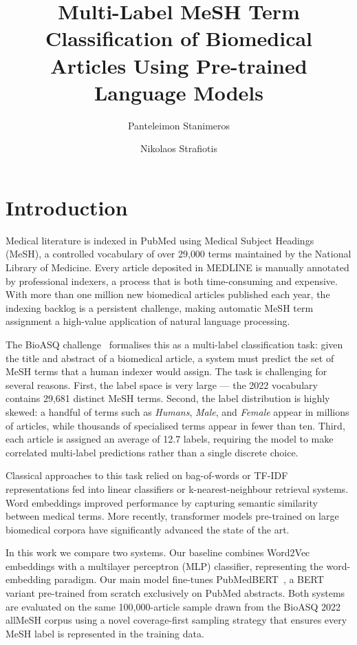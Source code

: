 \documentclass[sigconf]{acmart}
\title{Multi-Label MeSH Term Classification of Biomedical Articles Using Pre-trained Language Models}
\author{Panteleimon Stanimeros}
\affiliation{%
  \institution{MSc in AI and Data Analytics, University of Macedonia}
  \city{Thessaloniki}
  \country{Greece}
}
\author{Nikolaos Strafiotis}
\affiliation{%
  \institution{MSc in AI and Data Analytics, University of Macedonia}
  \city{Thessaloniki}
  \country{Greece}
}
\begin{document}
\maketitle

\section{Introduction}

Medical literature is indexed in PubMed using Medical Subject Headings (MeSH), a controlled
vocabulary of over 29{,}000 terms maintained by the National Library of Medicine. Every article
deposited in MEDLINE is manually annotated by professional indexers, a process that is both
time-consuming and expensive. With more than one million new biomedical articles published each
year, the indexing backlog is a persistent challenge, making automatic MeSH term assignment a
high-value application of natural language processing.

The BioASQ challenge~\cite{bioasq2015} formalises this as a multi-label classification task:
given the title and abstract of a biomedical article, a system must predict the set of MeSH terms
that a human indexer would assign. The task is challenging for several reasons. First, the label
space is very large — the 2022 vocabulary contains 29{,}681 distinct MeSH terms. Second, the label
distribution is highly skewed: a handful of terms such as \textit{Humans}, \textit{Male}, and
\textit{Female} appear in millions of articles, while thousands of specialised terms appear in
fewer than ten. Third, each article is assigned an average of 12.7 labels, requiring the model
to make correlated multi-label predictions rather than a single discrete choice.

Classical approaches to this task relied on bag-of-words or TF-IDF representations fed into
linear classifiers or k-nearest-neighbour retrieval systems. Word embeddings improved performance
by capturing semantic similarity between medical terms. More recently, transformer models
pre-trained on large biomedical corpora have significantly advanced the state of the art.

In this work we compare two systems. Our baseline combines Word2Vec embeddings with a multilayer
perceptron (MLP) classifier, representing the word-embedding paradigm. Our main model fine-tunes
PubMedBERT~\cite{pubmedbert}, a BERT variant pre-trained from scratch exclusively on PubMed
abstracts. Both systems are evaluated on the same 100{,}000-article sample drawn from the BioASQ
2022 allMeSH corpus using a novel coverage-first sampling strategy that ensures every MeSH label
is represented in the training data.
\end{document}
